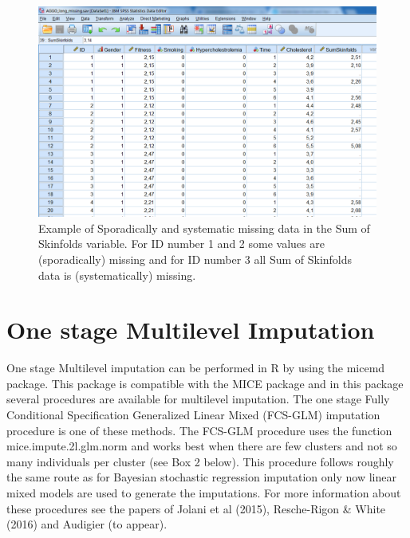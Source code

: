 \documentclass[]{book}
\theoremstyle{definition}
\theoremstyle{definition}
\theoremstyle{definition}
\theoremstyle{remark}
\begin{document}
\begin{figure}

{\centering \includegraphics[width=0.9\linewidth]{images/fig7.15} 

}

\caption{Example of Sporadically and systematic missing data in the Sum of Skinfolds variable. For ID number 1 and 2 some values are (sporadically) missing and for ID number 3 all Sum of Skinfolds data is (systematically) missing.}\label{fig:fig85}
\end{figure}

\section{One stage Multilevel
Imputation}\label{one-stage-multilevel-imputation}

One stage Multilevel imputation can be performed in R by using the
micemd package. This package is compatible with the MICE package and in
this package several procedures are available for multilevel imputation.
The one stage Fully Conditional Specification Generalized Linear Mixed
(FCS-GLM) imputation procedure is one of these methods. The FCS-GLM
procedure uses the function mice.impute.2l.glm.norm and works best when
there are few clusters and not so many individuals per cluster (see Box
2 below). This procedure follows roughly the same route as for Bayesian
stochastic regression imputation only now linear mixed models are used
to generate the imputations. For more information about these procedures
see the papers of Jolani et al (2015), Resche-Rigon \& White (2016) and
Audigier (to appear).
\end{document}
